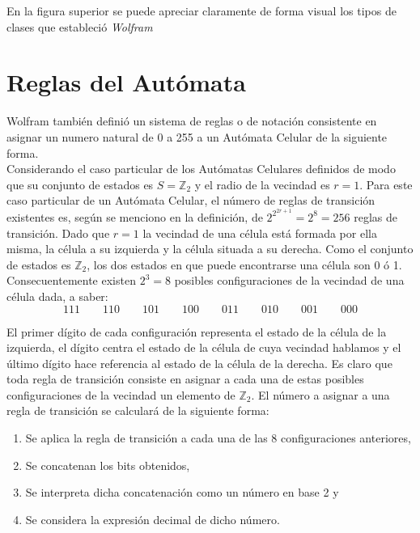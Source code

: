 En la figura superior se puede apreciar claramente de forma visual los tipos de clases que estableció \textit{Wolfram}



\section{Reglas del Autómata} %
Wolfram también definió un sistema de reglas o de notación consistente en asignar un numero natural de 0 a 255 a un Autómata Celular de la siguiente forma.\\

Considerando el caso particular de los Autómatas Celulares definidos de modo que su conjunto de estados es $S = \mathbb{Z}_2$ y el radio de la vecindad es $r = 1$. Para este caso particular de un Autómata Celular, el número de reglas de transición existentes es, según se menciono en la definición, de $2^{2^{2r+1}} = 2^8 = 256$ reglas de transición. Dado que $r = 1$ la vecindad de una célula está formada por ella misma, la célula a su izquierda y la célula situada a su derecha. Como el conjunto de estados es $\mathbb{Z}_2$, los dos estados en que puede encontrarse una célula son 0 ó 1. Consecuentemente existen $2^3 = 8$ posibles configuraciones de la vecindad de una célula dada, a saber: \\
$$111 \qquad 110 \qquad 101 \qquad 100 \qquad 011 \qquad 010 \qquad 001 \qquad 000$$

El primer dígito de cada configuración representa el estado de la célula de la izquierda, el dígito centra el estado de la célula de cuya vecindad hablamos y el último dígito hace referencia al estado de la célula de la derecha. Es claro que toda regla de transición consiste en asignar a cada una de estas posibles configuraciones de la vecindad un elemento de $\mathbb{Z}_2$. El número a asignar a una regla de transición se calculará de la siguiente forma:
\begin{enumerate}
 \item Se aplica la regla de transición a cada una de las 8 configuraciones anteriores,
 \item Se concatenan los bits obtenidos,
 \item Se interpreta dicha concatenación como un número en base 2 y
 \item Se considera la expresión decimal de dicho número.
\end{enumerate}

